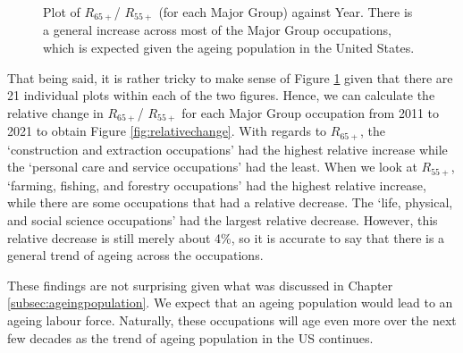 \documentclass[11pt]{article}
\begin{document}
 \begin{figure}
    \ContinuedFloat
    \centering
	\hfill
	\caption{Plot of $R_{65+}$/ $R_{55+}$ (for each Major Group) against Year. There is a general increase across most of the Major Group occupations, which is expected given the ageing population in the United States.}
	\label{fig:EP/OP against year}
\end{figure}

That being said, it is rather tricky to make sense of Figure \ref{fig:EP/OP against year} given that there are 21 individual plots within each of the two figures. Hence, we can calculate the relative change in $R_{65+}$/ $R_{55+}$ for each Major Group occupation from 2011 to 2021 to obtain Figure \ref{fig:relativechange}. With regards to $R_{65+}$, the `construction and extraction occupations' had the highest relative increase while the `personal care and service occupations' had the least. When we look at  $R_{55+}$, `farming, fishing, and forestry occupations' had the highest relative increase, while there are some occupations that had a relative decrease. The `life, physical, and social science occupations' had the largest relative decrease. However, this relative decrease is still merely about 4\%, so it is accurate to say that there is a general trend of ageing across the occupations.

These findings are not surprising given what was discussed in Chapter \ref{subsec:ageingpopulation}. We expect that an ageing population would lead to an ageing labour force. Naturally, these occupations will age even more over the next few decades as the trend of ageing population in the US continues.
\end{document}
